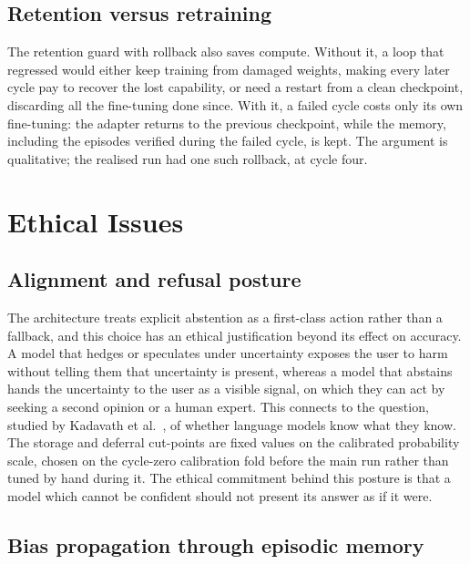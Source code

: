\subsection{Retention versus retraining}
\label{sec:env-retention}

The retention guard with rollback also saves compute. Without it, a loop that regressed would either keep training from damaged weights, making every later cycle pay to recover the lost capability, or need a restart from a clean checkpoint, discarding all the fine-tuning done since. With it, a failed cycle costs only its own fine-tuning: the adapter returns to the previous checkpoint, while the memory, including the episodes verified during the failed cycle, is kept. The argument is qualitative; the realised run had one such rollback, at cycle four.

\section{Ethical Issues}
\label{sec:ethics}

\subsection{Alignment and refusal posture}
\label{sec:ethics-alignment}

The architecture treats explicit abstention as a first-class action rather than a fallback, and this choice has an ethical justification beyond its effect on accuracy. A model that hedges or speculates under uncertainty exposes the user to harm without telling them that uncertainty is present, whereas a model that abstains hands the uncertainty to the user as a visible signal, on which they can act by seeking a second opinion or a human expert. This connects to the question, studied by Kadavath et al.~\cite{kadavath2022language}, of whether language models know what they know. The storage and deferral cut-points are fixed values on the calibrated probability scale, chosen on the cycle-zero calibration fold before the main run rather than tuned by hand during it. The ethical commitment behind this posture is that a model which cannot be confident should not present its answer as if it were.

\subsection{Bias propagation through episodic memory}
\label{sec:ethics-bias}

